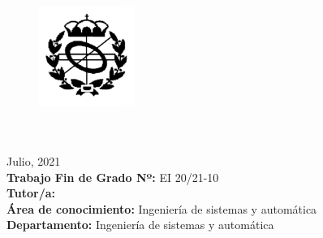 \begin{titlepage}
    \vspace{1.5cm}
    \begin{figure}
        \includegraphics[width=3.1cm]{img/cpetig.png}
    \end{figure}
    
    \phantom{nice}\\\phantom{trick}\\
    \normalsize{
        Julio, 2021\\
        \textbf{Trabajo Fin de Grado Nº:} EI 20/21-10\\
        \textbf{Tutor/a:} \tutor\\
        \textbf{Área de conocimiento:} Ingeniería de sistemas y automática \\
        \textbf{Departamento:} Ingeniería de sistemas y automática
    }

\end{titlepage}